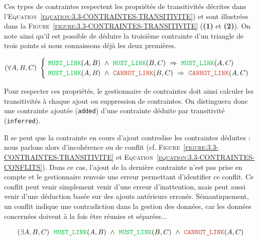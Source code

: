 		Ces types de contraintes respectent les propriétés de transitivités décrites dans l'\textsc{Equation~\ref{equation:3.3-CONTRAINTES-TRANSITIVITE}}) et sont illustrées dans la \textsc{Figure~\ref{figure:3.3-CONTRAINTES-TRANSITIVITE}} (\textbf{(1)} et \textbf{(2)}).
		On note ainsi qu'il est possible de déduire la troisième contrainte d'un triangle de trois points si nous connaissons déjà les deux premières.
		
		\begin{equation}
			\label{equation:3.3-CONTRAINTES-TRANSITIVITE}
			(\forall A,B,C)~
			\begin{cases}
				~\textcolor{colorDarkPastelGreen}{\texttt{MUST\_LINK}}(A,B)
				~\wedge~\textcolor{colorDarkPastelGreen}{\texttt{MUST\_LINK}}(B,C)
				~\Rightarrow~\textcolor{colorDarkPastelGreen}{\texttt{MUST\_LINK}}(A,C)  \\
				~\textcolor{colorDarkPastelGreen}{\texttt{MUST\_LINK}}(A,B)
				~\wedge~\textcolor{colorDarkPastelRed}{\texttt{CANNOT\_LINK}}(B,C)
				~\Rightarrow~\textcolor{colorDarkPastelRed}{\texttt{CANNOT\_LINK}}(A,C)
			\end{cases}
		\end{equation}
		
		Pour respecter ces propriétés, le gestionnaire de contraintes doit ainsi calculer les transitivités à chaque ajout ou suppression de contraintes.
		On distinguera donc une contrainte ajoutée (\texttt{added}) d'une contrainte déduite par transitivité (\texttt{inferred}).
		
		Il se peut que la contrainte en cours d'ajout contredise les contraintes déduites : nous parlons alors d'incohérence ou de conflit (cf. \textsc{Figure~\ref{figure:3.3-CONTRAINTES-TRANSITIVITE}} et \textsc{Equation~\ref{equation:3.3-CONTRAINTES-CONFLITS}}).
		Dans ce cas, l'ajout de la dernière contrainte n'est pas prise en compte et le gestionnaire renvoie une erreur permettant d'identifier ce conflit.
		Ce conflit peut venir simplement venir d'une erreur d’inattention, mais peut aussi venir d'une déduction basée sur des ajouts antérieurs erronés.
		Sémantiquement, un conflit indique une contradiction dans la gestion des données, car les données concernées doivent à la fois être réunies et séparées...
		
		\begin{equation}
			\label{equation:3.3-CONTRAINTES-CONFLITS}
			(\exists A,B,C)~
			~\textcolor{colorDarkPastelGreen}{\texttt{MUST\_LINK}}(A,B)
			~\wedge~\textcolor{colorDarkPastelGreen}{\texttt{MUST\_LINK}}(B,C)
			~\wedge~\textcolor{colorDarkPastelRed}{\texttt{CANNOT\_LINK}}(A,C)
		\end{equation}
		
